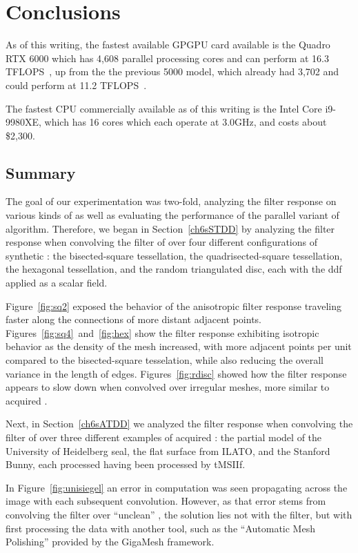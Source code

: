 \chapter{Conclusions}
As of this writing, the fastest available GPGPU card available is the Quadro RTX 6000 which has 4,608 parallel processing cores and can perform at 16.3 TFLOPS~\cite{quadro6k}, up from the the previous 5000 model, which already had 3,702 and could perform at 11.2 TFLOPS~\cite{quadro5k}.

The fastest CPU commercially available as of this writing is the Intel Core i9-9980XE, which has 16 cores which each operate at 3.0GHz, and costs about \$2,300.


%
%
%
%
%
%
\section{Summary}

The goal of our experimentation was two-fold, analyzing the filter response on various kinds of \tdd{} as well as evaluating the performance of the parallel variant of  algorithm. Therefore, we began in Section~\ref{ch6sSTDD} by analyzing the filter response when convolving the filter of over four different configurations of synthetic \tdd{}: the bisected-square tessellation, the quadrisected-square tessellation, the hexagonal tessellation, and the random triangulated disc, each with the \gls{ddf} applied as a scalar field.

Figure~\ref{fig:sq2} exposed the behavior of the anisotropic filter response traveling faster along the connections of more distant adjacent points. Figures~\ref{fig:sq4}~and~\ref{fig:hex} show the filter response exhibiting isotropic behavior as the density of the mesh increased, with more adjacent points per unit compared to the bisected-square tesselation, while also reducing the overall variance in the length of edges. Figures~\ref{fig:rdisc} showed how the filter response appears to slow down when convolved over irregular meshes, more similar to acquired \tdd{}.

Next, in Section~\ref{ch6sATDD} we analyzed the filter response when convolving the filter of over three different examples of acquired \tdd{}: the partial model of the University of Heidelberg seal, the flat surface from ILATO, and the Stanford Bunny, each processed having been processed by \gls{tMSIIf}.

In Figure~\ref{fig:unisiegel} an error in computation was seen propagating across the image with each subsequent convolution. However, as that error stems from convolving the filter over ``unclean'' \tdd{}, the solution lies not with the filter, but with first processing the data with another tool, such as the ``Automatic Mesh Polishing'' provided by the GigaMesh framework.

